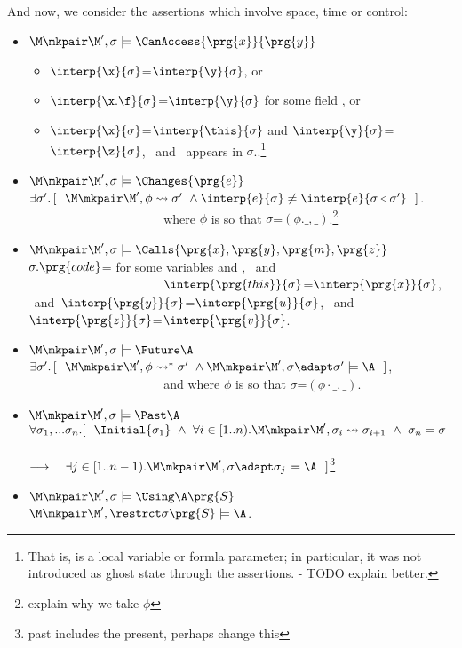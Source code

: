 \begin{definition}
And now, we consider the assertions which involve space, time or control:

\begin{itemize}
\item
$\M\mkpair \M', \sigma \models  \CanAccess{\prg{x}}{\prg{y}}$   \IFF  \begin{itemize}
\item
$\interp {\x} {\sigma}$=$\interp {\y} {\sigma}$, or
\item
$\interp {\x.\f} {\sigma}$=$\interp {\y} {\sigma}$  for some field ,  or
\item
$\interp {\x} {\sigma}$=$\interp {\this} {\sigma}$ and
  $\interp {\y} {\sigma}$=$\interp {\z} {\sigma}$,
\
and \z\ appears in  $\sigma$..\footnote{That is, \z is a local variable or formla parameter; in particular, it was   not introduced as ghost state through the assertions. - TODO explain better.}
 \end{itemize}
 \item
 $\M\mkpair \M', \sigma \models   \Changes{\prg{e}}$  \IFF 
 $\exists \sigma'.\, [\ \ \M\mkpair \M',\phi \leadsto \sigma' \ \wedge \interp{e}{\sigma} \neq \interp{e}{\sigma\triangleleft \sigma'} \ \  ]$.
 \\
 $\strut ~ \hspace{1.4in} $ where $\phi$ is so that $\sigma$=$(\phi.\_,\_)$.\footnote{explain why we take $\phi$}
 \item
$\M\mkpair \M', \sigma \models  \Calls{\prg{x},\prg{y},\prg{m},\prg{z}}$ \IFF \
 $\sigma.\prg{code}$= for some variables  and ,  \ and \  
\\ $\strut ~ \hspace{1.4in} $ 
$\interp{\prg{this}}{\sigma}$=$\interp{\prg{x}}{\sigma}$, \ and\ $\interp{\prg{y}}{\sigma}$=$\interp{\prg{u}}{\sigma}$,
 \ and\ $\interp{\prg{z}}{\sigma}$=$\interp{\prg{v}}{\sigma}$.
 \item
  $\M\mkpair \M', \sigma \models  \Future \A $
  \IFF
  $\exists \sigma'.\, [\ \ \M\mkpair \M',\phi \leadsto^* \sigma' \ \wedge \M\mkpair \M',\sigma\adapt\sigma' \models \A \ \  ]$, 
 \\
$\strut ~ \hspace{1.4in} $  and where $\phi$ is so that $\sigma$=$(\phi\cdot\_,\_)$.
 \item
 $\M\mkpair \M', \sigma \models  \Past \A $ \IFF 
 $\forall \sigma_1, ... \sigma_n. [\ \ \Initial{\sigma_1}\ \wedge \ 
 \forall i\in[1..n). \M\mkpair \M', \sigma_{i} \leadsto  \sigma_{i+1} \ \wedge \ 
 \sigma_n=\sigma$
 \\
$\strut ~ \hspace{1.9in} $  $ \longrightarrow \ \ \  \exists j\in [1..n-1).
 \M\mkpair \M', \sigma\adapt\sigma_j  \models \A\ \ 
 ]$\footnote{past includes the present, perhaps change this}
 \item
 $\M\mkpair \M', \sigma \models \Using \A \prg{S}$
 \IFF
 $\M\mkpair \M', \restrct \sigma {\prg{S}} \models  \A  $.
\end{itemize}


\end{definition}
